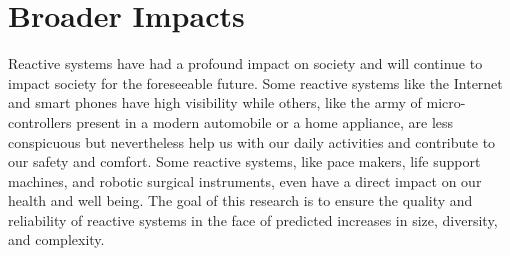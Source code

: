 
\section{Broader Impacts}

Reactive systems have had a profound impact on society and will continue to impact society for the foreseeable future.
Some reactive systems like the Internet and smart phones have high visibility while others, like the army of micro-controllers present in a modern automobile or a home appliance, are less conspicuous but nevertheless help us with our daily activities and contribute to our safety and comfort.
Some reactive systems, like pace makers, life support machines, and robotic surgical instruments, even have a direct impact on our health and well being.
The goal of this research is to ensure the quality and reliability of reactive systems in the face of predicted increases in size, diversity, and complexity.



